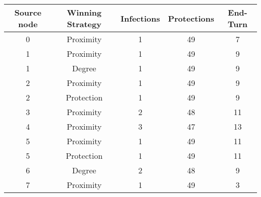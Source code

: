 \documentclass[results.tex]{subfiles}
\begin{document}
    \begin{center}
        \begin{tabular}{| c || c | c | c | c |}
            \hline
            {\bfseries Source node} & {\bfseries Winning Strategy} & {\bfseries Infections} & {\bfseries Protections}
            & {\bfseries End-Turn}
            \\  %
            \hline\hline
            0                       & Proximity                    & 1                      & 49                      & 7                    \\
            \hline
            1                       & Proximity                    & 1                      & 49                      & 9                    \\
            \hline
            1                       & Degree                       & 1                      & 49                      & 9                    \\
            \hline
            2                       & Proximity                    & 1                      & 49                      & 9                    \\
            \hline
            2                       & Protection                   & 1                      & 49                      & 9                    \\
            \hline
            3                       & Proximity                    & 2                      & 48                      & 11                   \\
            \hline
            4                       & Proximity                    & 3                      & 47                      & 13                   \\
            \hline
            5                       & Proximity                    & 1                      & 49                      & 11                   \\
            \hline
            5                       & Protection                   & 1                      & 49                      & 11                   \\
            \hline
            6                       & Degree                       & 2                      & 48                      & 9                    \\
            \hline
            7                       & Proximity                    & 1                      & 49                      & 3                    \\

\end{tabular}
\end{center}
\end{document}
